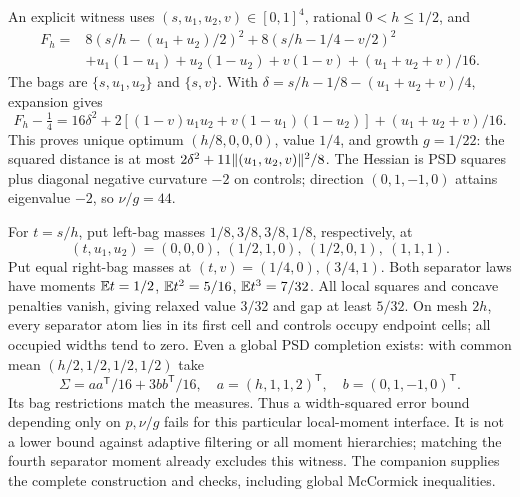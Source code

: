 An explicit witness uses $(s,u_1,u_2,v)\in[0,1]^4$, rational
$0<h\le1/2$, and
\begin{align*}
F_h={}&8(s/h-(u_1+u_2)/2)^2+8(s/h-1/4-v/2)^2\\
&+u_1(1-u_1)+u_2(1-u_2)+v(1-v)+(u_1+u_2+v)/16.
\end{align*}
The bags are $\{s,u_1,u_2\}$ and $\{s,v\}$. With
$\delta=s/h-1/8-(u_1+u_2+v)/4$, expansion gives
\[
F_h-\tfrac14=16\delta^2+
2[(1-v)u_1u_2+v(1-u_1)(1-u_2)]+(u_1+u_2+v)/16.
\]
This proves unique optimum $(h/8,0,0,0)$, value $1/4$, and growth
$g=1/22$: the squared distance is at most
$2\delta^2+11\lVert(u_1,u_2,v)\rVert^2/8$. The Hessian is PSD squares
plus diagonal negative curvature $-2$ on controls; direction
$(0,1,-1,0)$ attains eigenvalue $-2$, so $\nu/g=44$.

For $t=s/h$, put left-bag masses $1/8,3/8,3/8,1/8$, respectively, at
\[
(t,u_1,u_2)=(0,0,0),\ (1/2,1,0),\ (1/2,0,1),\ (1,1,1).
\]
Put equal right-bag masses at $(t,v)=(1/4,0),(3/4,1)$.
Both separator laws have moments $\mathbb E t=1/2$, $\mathbb E t^2=5/16$,
$\mathbb E t^3=7/32$. All local squares and concave penalties vanish, giving
relaxed value $3/32$ and gap at least $5/32$. On mesh $2h$, every
separator atom lies in its first cell and controls occupy endpoint cells;
all occupied widths tend to zero. Even a global PSD completion exists:
with common mean $(h/2,1/2,1/2,1/2)$ take
\[
\Sigma=aa^{\mathsf T}/16+3bb^{\mathsf T}/16,
\quad a=(h,1,1,2)^{\mathsf T},\quad b=(0,1,-1,0)^{\mathsf T}.
\]
Its bag restrictions match the measures. Thus a width-squared error bound
depending only on $p,\nu/g$ fails for this particular local-moment
interface. It is not a lower bound against adaptive filtering or all
moment hierarchies; matching the fourth separator moment already excludes
this witness. The companion supplies the complete construction and
checks, including global McCormick inequalities.

